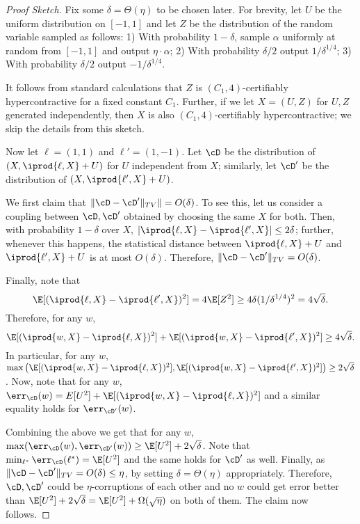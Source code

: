 \begin{proof}[Proof Sketch]%
Fix some $\delta = \Theta(\eta)$ to be chosen later. For brevity, let $U$ be the uniform distribution on $[-1,1]$ and let $Z$ be the distribution of the random variable sampled as follows: 1) With probability $1-\delta$, sample $\alpha$ uniformly at random from $[-1,1]$ and output $\eta \cdot \alpha$; 2) With probability $\delta/2$ output $1/\delta^{1/4}$; 3) With probability $\delta/2$ output $-1/\delta^{1/4}$. 

It follows from standard calculations that $Z$ is $(C_1,4)$-certifiably hypercontractive for a fixed constant $C_1$. Further, if we let $X = (U, Z)$ for $U,Z$ generated independently, then $X$ is also $(C_1,4)$-certifiably hypercontractive; we skip the details from this sketch.

Now let $\ell = (1,1)$ and $\ell' = (1,-1)$. Let $\cD$ be the distribution of $(X, \iprod{\ell,X} + U)$ for $U$ independent from $X$; similarly, let $\cD'$ be the distribution of $(X, \iprod{\ell',X} + U)$. 

We first claim that $\|\cD - \cD'\|_{TV}\| = O(\delta)$. To see this, let us consider a coupling between $\cD, \cD'$ obtained by choosing the same $X$ for both. Then, with probability $1-\delta$ over $X$, $|\iprod{\ell,X} - \iprod{\ell',X}| \leq 2 \delta$; further, whenever this happens, the statistical distance between $\iprod{\ell,X} + U$ and $\iprod{\ell',X} + U$ is at most $O(\delta)$. Therefore, $\|\cD - \cD'\|_{TV} = O(\delta)$. 

Finally, note that 
$$\E[ (\iprod{\ell,X} - \iprod{\ell',X})^2] = 4 \E[Z^2] \geq 4 \delta (1/\delta^{1/4})^2 = 4 \sqrt{\delta}.$$
Therefore, for any $w$, 
$$\E[ (\iprod{w,X} - \iprod{\ell,X})^2] + \E[ (\iprod{w,X} - \iprod{\ell',X})^2] \geq 4 \sqrt{\delta}.$$
In particular, for any $w$, $\max\left(\E[ (\iprod{w,X} - \iprod{\ell,X})^2], \E[ (\iprod{w,X} - \iprod{\ell',X})^2]\right) \geq 2 \sqrt{\delta}$. Now, note that for any $w$, $\err_\cD(w) = E[U^2] + \E[ (\iprod{w,X} - \iprod{\ell,X})^2]$ and a similar equality holds for $\err_{\cD'}(w)$. 

Combining the above we get that for any $w$, $\max(\err_\cD(w), \err_{\cD'}(w)) \geq \E[U^2] + 2 \sqrt{\delta}$. Note that $\min_{\ell^*} \err_\cD(\ell^*) = \E[U^2]$ and the same holds for $\cD'$ as well. Finally, as $\|\cD - \cD'\|_{TV} = O(\delta) \leq \eta$, by setting $\delta = \Theta(\eta)$ appropriately. Therefore, $\cD, \cD'$ could be $\eta$-corruptions of each other and no $w$ could get error better than $\E[U^2] + 2 \sqrt{\delta} = \E[U^2] + \Omega(\sqrt{\eta})$ on both of them. The claim now follows.
\end{proof}
